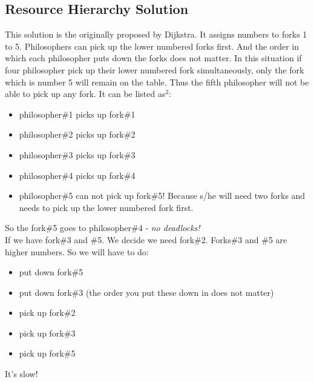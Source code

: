 \documentclass[12pt,a4paper]{report}
\begin{document}
 \subsection*{Resource Hierarchy Solution}
 \begin{flushleft}
  This solution is the originally proposed by Dijkstra. It assigns numbers to forks 1 to 5. Philosophers can pick up the 
  lower numbered forks first. And the order in which each philosopher puts down the forks does not matter. In this situation 
  if four philosopher pick up their lower numbered fork simultaneously, only the fork which is number 5 will remain on the 
  table. Thus the fifth philosopher will not be able to pick up any fork. It can be listed as$^2$:
  \begin{itemize}
   \item philosopher\#1 picks up fork\#1
   \item philosopher\#2 picks up fork\#2
   \item philosopher\#3 picks up fork\#3
   \item philosopher\#4 picks up fork\#4
   \item philosopher\#5 can not pick up fork\#5! Because s/he will need two forks and needs to pick up the lower numbered 
   fork first.
  \end{itemize}
  So the fork\#5 goes to philosopher\#4 - \emph{no deadlocks!}\\
  If we have fork\#3 and \#5. We decide we need fork\#2. Forks\#3 and \#5 are higher numbers. So we will have to do:
  \begin{itemize}
   \item put down fork\#5
   \item put down fork\#3 (the order you put these down in does not matter)
   \item pick up fork\#2
   \item pick up fork\#3
   \item pick up fork\#5
  \end{itemize}
  It's slow!
 \end{flushleft}
 \pagebreak
\end{document}
